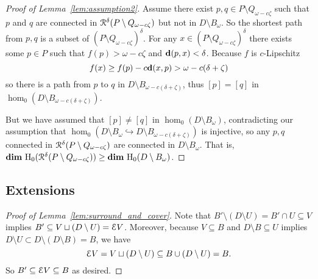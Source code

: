 \begin{proof}[Proof of Lemma~\ref{lem:assumption2}]
  Assume there exist $p,q \in P\setminus Q_{\omega-c\zeta}$ such that $p$ and $q$ are connected in $\mathcal{R}^\delta(P\setminus Q_{\omega-c\zeta})$ but not in $D\setminus B_\omega$.
  So the shortest path from $p, q$ is a subset of $(P\setminus Q_{\omega-c\zeta})^\delta$.
  For any $x\in (P\setminus Q_{\omega-c\zeta})^\delta$ there exists some $p\in P$ such that $f(p) > \omega - c\zeta$ and $\mathbf{d}(p,x) < \delta$.
  Because $f$ is $c$-Lipschitz
  \[ f(x)\geq f(p) - c\mathbf{d}(x,p) > \omega - c(\delta+\zeta)\]
  so there is a path from $p$ to $q$ in $D\setminus B_{\omega-c(\delta+\zeta)}$, thus $[p] = [q]$ in $\hom_0(D\setminus B_{\omega-c(\delta+\zeta)})$.

  But we have assumed that $[p]\neq[q]$ in $\hom_0(D\setminus B_\omega)$, contradicting our assumption that $\hom_0(D\setminus B_\omega\hookrightarrow D\setminus B_{\omega-c(\delta+\zeta)})$ is injective, so any $p,q$ connected in $\mathcal{R}^\delta(P\setminus Q_{\omega-c\zeta})$ are connected in $D\setminus B_\omega$.
  That is, $\mathbf{dim}~\mathrm{H}_0(\mathcal{R}^\delta(P\setminus Q_{\omega-c\zeta}))\geq \mathbf{dim}~\mathrm{H}_0(D\setminus B_\omega)$.
\end{proof}

\subsection{Extensions}

\begin{proof}[Proof of Lemma~\ref{lem:surround_and_cover}]
  Note that $B'\setminus (D\setminus U) = B'\cap U\subseteq V$ implies $B'\subseteq V\sqcup(D\setminus U) = \mathcal{E} V$.
  Moreover, because $V\subseteq B$ and $D\setminus B\subseteq U$ implies $D\setminus U \subset D\setminus (D\setminus B) = B$, we have
  \[ \mathcal{E} V = V\sqcup (D\setminus U) \subseteq B\cup (D\setminus U) = B. \]
  So $B' \subseteq \mathcal{E} V\subseteq B$ as desired.
\end{proof}

